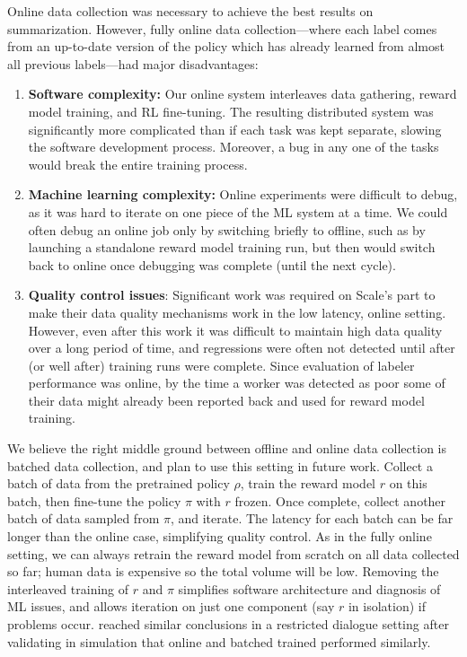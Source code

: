 \documentclass{article}
\begin{document}
Online data collection was necessary to achieve the best results on summarization.  However, fully online data collection---where each label comes from an up-to-date
version of the policy which has already learned
from almost all previous labels---had major disadvantages:
\begin{enumerate}
\item \textbf{Software complexity:} Our online system interleaves data gathering, reward model training, and RL fine-tuning.  The resulting distributed system was significantly more complicated than if each task was kept separate, slowing the software development process.  Moreover, a bug in any one of the tasks would break the entire training process. 
\item \textbf{Machine learning complexity:} Online experiments were difficult to debug, as it was hard to iterate on one piece of the ML system at a time.  We could often debug an online job only by switching briefly to offline, such as by launching a standalone reward model training run, but then would switch back to online once debugging was complete (until the next cycle).
\item \textbf{Quality control issues}: Significant work was required on Scale's part to make their data quality mechanisms work in the low latency, online setting.  However, even after this work it was difficult to maintain high data quality over a long period of time, and regressions were often not detected until after (or well after) training runs were complete.  Since evaluation of labeler performance was online, by the time a worker was detected as poor some of their data might already been reported back and used for reward model training.
\end{enumerate}
We believe the right middle ground between offline and online data collection is batched data collection, and plan to use this setting in future work.  Collect a batch of data from the pretrained policy $\rho$, train the reward model $r$ on this batch, then fine-tune the policy $\pi$ with $r$ frozen.  Once complete, collect another batch of data sampled from $\pi$, and iterate.  The latency for each batch can be far longer than the online case, simplifying quality control.  As in the fully online setting, we can always retrain the reward model from scratch on all data collected so far; human data is expensive so the total volume will be low.  Removing the interleaved training of $r$ and $\pi$ simplifies software architecture and diagnosis of ML issues, and allows iteration on just one component (say $r$ in isolation) if problems occur.  \citet{li2016dialogue} reached similar conclusions in a restricted dialogue setting after validating in simulation that online and batched trained performed similarly.
\end{document}
